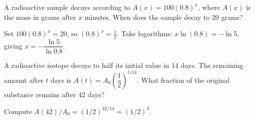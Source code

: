 \documentclass{ximera}
\begin{document}
\begin{problem}
A radioactive sample decays according to $A(x) = 100(0.8)^x$, where $A(x)$ is the mass in grams after $x$ minutes. When does the sample decay to 20 grams?

\begin{center}
\end{center}

\begin{hint}
Set $100(0.8)^x=20$, so $(0.8)^x=\tfrac{1}{5}$. Take logarithms: $x\ln(0.8)=-\ln 5$, giving $x=-\dfrac{\ln 5}{\ln 0.8}$.
\end{hint}
\begin{multipleChoice}
\end{multipleChoice}
\end{problem}

\begin{problem}
A radioactive isotope decays to half its initial value in 14 days. The remaining amount after $t$ days is $A(t) = A_0\!\left(\dfrac{1}{2}\right)^{t/14}$. What fraction of the original substance remains after 42 days?
\begin{hint}
Compute $A(42)/A_0 = (1/2)^{42/14} = (1/2)^3$.
\end{hint}
\begin{multipleChoice}
\end{multipleChoice}
\end{problem}
\end{document}
